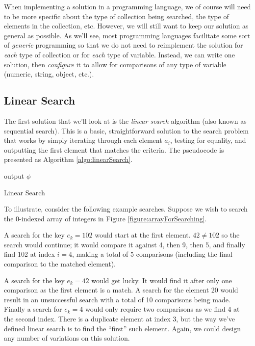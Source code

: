 When implementing a solution in a programming language, we of course
will need to be more specific about the type of collection being
searched, the type of elements in the collection, etc.  However, we
will still want to keep our solution as general as possible.  As we'll 
see, most programming languages facilitate some sort of \emph{generic}
programming so that we do not need to reimplement the solution for
\emph{each} type of collection or for \emph{each} type of variable.  
Instead, we can write one solution, then \emph{configure} it to allow
for comparisons of any type of variable (numeric, string, object, etc.).

\subsection{Linear Search}

The first solution that we'll look at is the \emph{linear search}
algorithm (also known as sequential search).  This is a basic, 
straightforward solution to the search problem that works by simply
iterating through each element $a_i$, testing for equality, and
outputting the first element that matches the criteria.  The
pseudocode is presented as Algorithm \ref{algo:linearSearch}.

\begin{algorithm}[H]
  output $\phi$ \;
\caption{Linear Search}
\label{algo:linearSearch}
\end{algorithm}

To illustrate, consider the following example searches.  Suppose we wish
to search the 0-indexed array of integers in Figure \ref{figure:arrayForSearching}.



A search for the key $e_k = 102$ would start at the first element.  
$42 \neq 102$ so the search would continue; it would compare it against
4, then 9, then 5, and finally find 102 at index $i = 4$, making a
total of 5 comparisons (including the final comparison to the matched
element).  

A search for the key $e_k = 42$ would get lucky.  It would find it
after only one comparison as the first element is a match.  A search
for the element 20 would result in an unsuccessful search with a 
total of 10 comparisons being made.  Finally a search for $e_k = 4$
would only require two comparisons as we find 4 at the second index.
There is a duplicate element at index 3, but the way we've defined
linear search is to find the ``first'' such element.  Again, we could
design any number of variations on this solution.

